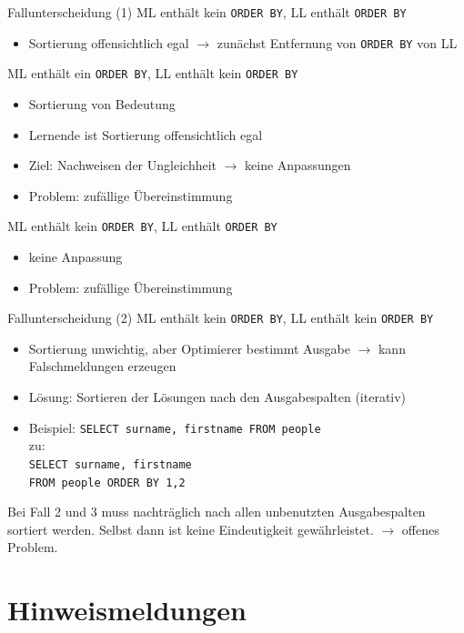 \documentclass{beamer}
\begin{document}
\begin{frame}[fragile]{Fallunterscheidung (1)}
ML enthält kein \verb|ORDER BY|, LL enthält \verb|ORDER BY|
\begin{itemize}
\item Sortierung offensichtlich egal $\to$ zunächst Entfernung von \verb|ORDER BY| von LL
\end{itemize}

ML enthält ein \verb|ORDER BY|, LL enthält kein \verb|ORDER BY|
\begin{itemize}
\item Sortierung von Bedeutung
\item Lernende ist Sortierung offensichtlich egal
\item Ziel: Nachweisen der Ungleichheit $\to$ keine Anpassungen
\item Problem: zufällige Übereinstimmung
\end{itemize}

ML enthält kein \verb|ORDER BY|, LL enthält \verb|ORDER BY|
\begin{itemize}
\item keine Anpassung
\item Problem: zufällige Übereinstimmung
\end{itemize}
\end{frame}

\begin{frame}[fragile]{Fallunterscheidung (2)}
ML enthält kein \verb|ORDER BY|, LL enthält kein \verb|ORDER BY|
\begin{itemize}
\item Sortierung unwichtig, aber Optimierer bestimmt Ausgabe $\to$ kann Falschmeldungen erzeugen
\item Lösung: Sortieren der Lösungen nach den Ausgabespalten (iterativ)
\item Beispiel: \verb|SELECT surname, firstname FROM people|\\
zu:\\\verb|SELECT surname, firstname|\\\verb|FROM people ORDER BY 1,2|
\end{itemize}
Bei Fall 2 und 3 muss nachträglich nach allen unbenutzten Ausgabespalten sortiert werden. Selbst dann ist keine Eindeutigkeit gewährleistet. $\to$ offenes Problem.
\end{frame}

\section{Hinweismeldungen}
\end{document}
